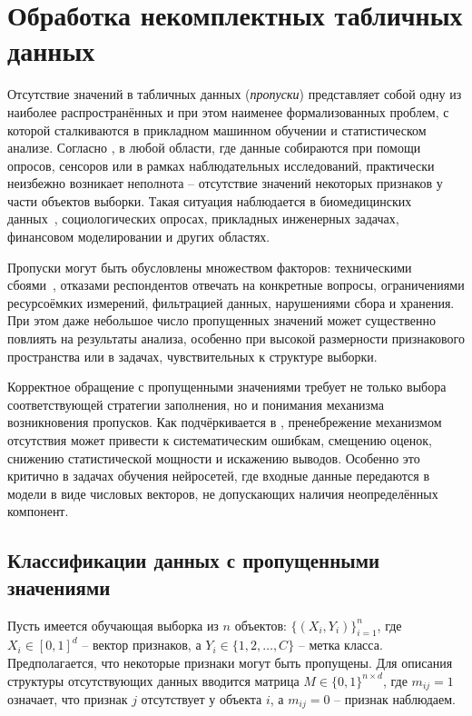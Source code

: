 \section{Обработка некомплектных табличных данных}

Отсутствие значений в табличных данных (\emph{пропуски}) представляет собой одну из наиболее распространённых и при этом наименее формализованных проблем, с которой сталкиваются в прикладном машинном обучении и статистическом анализе. Согласно \cite{little1995statistical}, в любой области, где данные собираются при помощи опросов, сенсоров или в рамках наблюдательных исследований, практически неизбежно возникает неполнота -- отсутствие значений некоторых признаков у части объектов выборки. Такая ситуация наблюдается в биомедицинских данных~\cite{cismondi2013missing}, социологических опросах, прикладных инженерных задачах, финансовом моделировании и других областях.

Пропуски могут быть обусловлены множеством факторов: техническими сбоями~\cite{du2020missing}, отказами респондентов отвечать на конкретные вопросы, ограничениями ресурсоёмких измерений, фильтрацией данных, нарушениями сбора и хранения. При этом даже небольшое число пропущенных значений может существенно повлиять на результаты анализа, особенно при высокой размерности признакового пространства или в задачах, чувствительных к структуре выборки.

Корректное обращение с пропущенными значениями требует не только выбора соответствующей стратегии заполнения, но и понимания механизма возникновения пропусков. Как подчёркивается в \cite{little1995statistical, schafer1997analysis}, пренебрежение механизмом отсутствия может привести к систематическим ошибкам, смещению оценок, снижению статистической мощности и искажению выводов. Особенно это критично в задачах обучения нейросетей, где входные данные передаются в модели в виде числовых векторов, не допускающих наличия неопределённых компонент.

\subsection{Классификации данных с пропущенными значениями}

Пусть имеется обучающая выборка из \(n\) объектов: \( \{(X_i, Y_i)\}_{i=1}^n \), где \(X_i \in [0, 1]^d\) -- вектор признаков, а \(Y_i \in \{1, 2, \dots, C\}\) -- метка класса. Предполагается, что некоторые признаки могут быть пропущены. Для описания структуры отсутствующих данных вводится матрица \(M \in \{0, 1\}^{n \times d}\), где \(m_{ij} = 1\) означает, что признак \(j\) отсутствует у объекта \(i\), а \(m_{ij} = 0\) -- признак наблюдаем.

